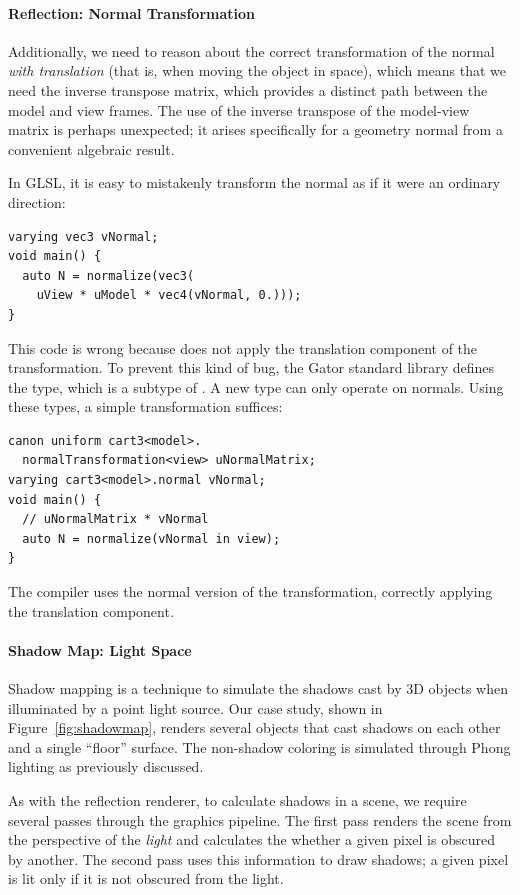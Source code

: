 \documentclass[../main.tex]{subfiles}
\begin{document}
{\paragraph{Reflection: Normal Transformation}
Additionally, we need to reason about the correct transformation of the normal \emph{with translation} (that is, when moving the object in space), which means that we need the inverse transpose matrix, which provides a distinct path between the model and view frames.  The use of the inverse transpose of the model-view matrix is perhaps unexpected; it arises specifically for a geometry normal from a convenient algebraic result.

In GLSL, it is easy to mistakenly transform the normal as if it were an ordinary direction:
%
\begin{lstlisting}
varying vec3 vNormal;
void main() {
  auto N = normalize(vec3(
    uView * uModel * vec4(vNormal, 0.)));
}
\end{lstlisting}
%
This code is wrong because  does not apply the translation component of the  transformation.
To prevent this kind of bug, the Gator standard library defines the  type, which is a subtype of .
A new  type can only operate on normals.
Using these types, a simple  transformation suffices:
%
\begin{lstlisting}
canon uniform cart3<model>.
  normalTransformation<view> uNormalMatrix;
varying cart3<model>.normal vNormal;
void main() {
  // uNormalMatrix * vNormal
  auto N = normalize(vNormal in view);  
}
\end{lstlisting}
%
The compiler uses the normal version of the transformation, correctly applying the translation component.

\paragraph{Shadow Map: Light Space}
Shadow mapping is a technique to simulate the shadows cast by 3D objects when illuminated by a point light source.  Our case study, shown in Figure~\ref{fig:shadowmap}, renders several objects that cast shadows on each other and a single ``floor'' surface.  The non-shadow coloring is simulated through Phong lighting as previously discussed.

As with the reflection renderer, to calculate shadows in a scene, we require several passes through the graphics pipeline.  The first pass renders the scene from the perspective of the \emph{light} and calculates the whether a given pixel is obscured by another.  The second pass uses this information to draw shadows; a given pixel is lit only if it is not obscured from the light.

}
\end{document}
